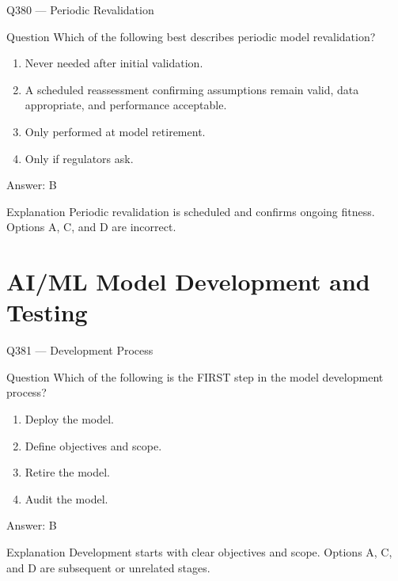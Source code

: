 \documentclass[aspectratio=169,8pt]{beamer}
\begin{document}
	\begin{frame}{Q380 --- Periodic Revalidation}
		\begin{block}{Question}
			Which of the following best describes periodic model revalidation?
			\begin{enumerate}
				\item Never needed after initial validation.
				\item A scheduled reassessment confirming assumptions remain valid, data appropriate, and performance acceptable.
				\item Only performed at model retirement.
				\item Only if regulators ask.
			\end{enumerate}
		\end{block}
		\begin{exampleblock}{Answer: B}\end{exampleblock}
		\begin{block}{Explanation}
			Periodic revalidation is scheduled and confirms ongoing fitness. Options A, C, and D are incorrect.
		\end{block}
	\end{frame}
	
	\section{AI/ML Model Development and Testing}
	
	\begin{frame}{Q381 --- Development Process}
		\begin{block}{Question}
			Which of the following is the FIRST step in the model development process?
			\begin{enumerate}
				\item Deploy the model.
				\item Define objectives and scope.
				\item Retire the model.
				\item Audit the model.
			\end{enumerate}
		\end{block}
		\begin{exampleblock}{Answer: B}\end{exampleblock}
		\begin{block}{Explanation}
			Development starts with clear objectives and scope. Options A, C, and D are subsequent or unrelated stages.
		\end{block}
	\end{frame}
	
\end{document}
